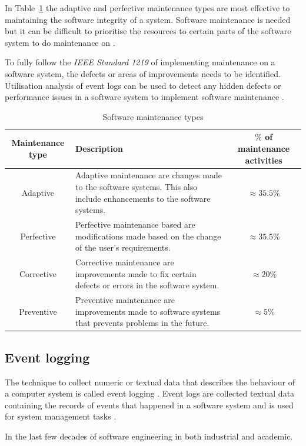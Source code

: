 In Table~\ref{tbl:CH1_MaintenanceTypes} the adaptive and perfective maintenance types are most effective to maintaining the software integrity of a system. Software maintenance is needed but it can be difficult to prioritise the resources to certain parts of the software system to do maintenance on \cite{Mamone1994, Hasan2012}.\par To fully follow the \textit{IEEE Standard 1219} of implementing maintenance on a software system, the defects or areas of improvements needs to be identified. Utilisation analysis of event logs can be used to detect any hidden defects or performance issues in a software system to implement software maintenance \cite{Cinque2013, Rong2018a}.

\clearpage

\begin{table}[!htb]
    \centering
    \small
    \caption{Software maintenance types}
    \label{tbl:CH1_MaintenanceTypes}
    \begin{tabularx}{\textwidth}{|c|X|c|}
        \hline
        \textbf{Maintenance type} & \textbf{Description} & \textbf{$\%$ of maintenance activities} \\ \hline
        Adaptive & \raggedright Adaptive maintenance are changes made to the software systems. This also include enhancements to the software systems. & $\approx 35.5\%$ \\ \hline
        Perfective & Perfective maintenance based are modifications made based on the change of the user's requirements. & $\approx 35.5\%$ \\ \hline
        Corrective & \raggedright Corrective maintenance are improvements made to fix certain defects or errors in the software system. & $\approx 20\%$ \\ \hline
        Preventive & \raggedright  Preventive maintenance are improvements made to software systems that prevents problems in the future. & $\approx 5\%$ \\ \hline
    \end{tabularx}
\end{table}

\subsection{Event logging}
The technique to collect numeric or textual data that describes the behaviour of a computer system is called event logging \cite{Pecchia2015, Baccanico2014}. Event logs are collected textual data containing the records of events that happened in a software system and is used for system management tasks \cite{Rong2018a, Rong2018, Baccanico2014}.\par In the last few decades of software engineering in both industrial and academic.

